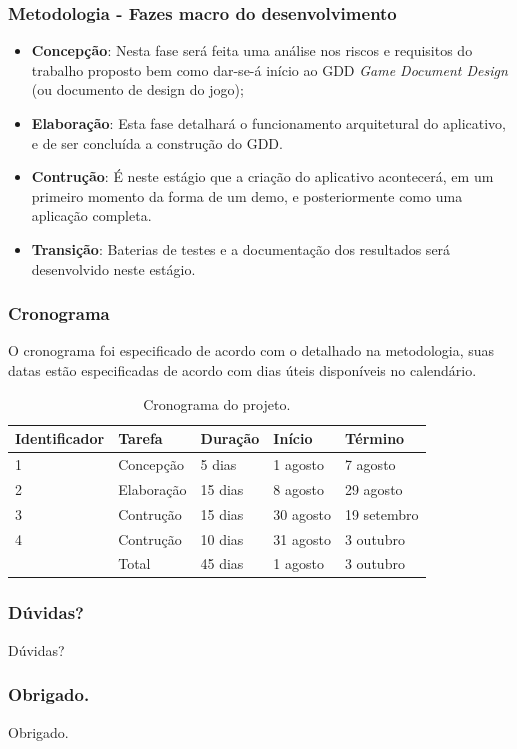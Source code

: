 \documentclass{beamer}
\begin{document}
\begin{frame}
\frametitle{Metodologia  - Fazes macro do desenvolvimento}
  \begin{itemize}
  \item \textbf{Concepção}:  Nesta fase será feita uma análise nos riscos e requisitos do trabalho proposto bem como dar-se-á início ao GDD \textit{Game Document Design} (ou documento de design do jogo);
  \item \textbf{Elaboração}: Esta fase detalhará o funcionamento arquitetural do aplicativo, e de ser concluída a construção do GDD.
  \item \textbf{Contrução}: É neste estágio que a criação do aplicativo acontecerá, em um primeiro momento da forma de um demo, e posteriormente como uma aplicação completa.
  \item \textbf{Transição}: Baterias de testes e a documentação dos resultados será desenvolvido neste estágio.
  \end{itemize}

  \end{frame}

\begin{frame}
\frametitle{Cronograma}

O cronograma foi especificado de acordo com o detalhado na metodologia, suas datas estão especificadas de acordo com dias úteis disponíveis no calendário.\\
\begin{table}[!htbp]
                           \begin{center}
                \begin{tabular}{ | l | l | l | l | l |}
                \hline  
                \textbf{Identificador}& \textbf{Tarefa} &  \textbf{Duração} & \textbf{Início} & \textbf{Término} \\  \hline
                1 & Concepção & 5 dias & 1 agosto & 7 agosto \\  \hline
                2 & Elaboração & 15 dias & 8 agosto & 29 agosto \\  \hline
                3 & Contrução & 15 dias & 30 agosto & 19 setembro \\  \hline
                4 & Contrução & 10 dias & 31 agosto & 3 outubro \\ \hline
                  & Total & 45 dias & 1 agosto & 3 outubro \\
                \hline
                \end{tabular}
            \end{center}
               \caption{Cronograma do projeto. \label{fig:Cordova}}
\end{table}

\end{frame}

\begin{frame}
\frametitle{Dúvidas?}
Dúvidas?
\end{frame}

\begin{frame}
\frametitle{Obrigado.}
Obrigado.
\end{frame}
\end{document}
